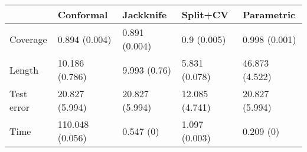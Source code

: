 \begin{tabular}{|l|l|l|l|l|}
\hline
& Conformal & Jackknife & Split+CV & Parametric \\
\hline
Coverage & 0.894 (0.004) & 0.891 (0.004) & 0.9 (0.005) & 0.998 (0.001) \\
\hline
Length & 10.186 (0.786) & 9.993 (0.76) & 5.831 (0.078) & 46.873 (4.522) \\
\hline
Test error & 20.827 (5.994) & 20.827 (5.994) & 12.085 (4.741) & 20.827 (5.994) \\
\hline
Time & 110.048 (0.056) & 0.547 (0) & 1.097 (0.003) & 0.209 (0) \\
\hline
\end{tabular}
